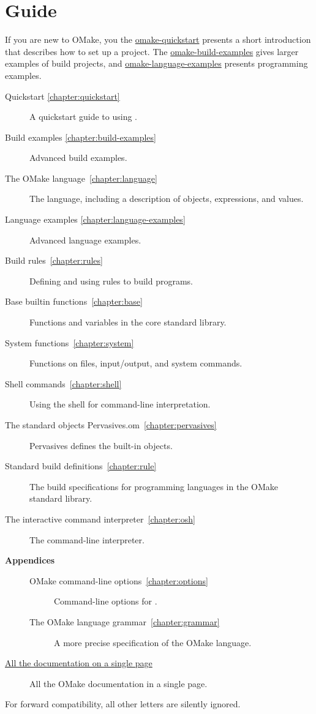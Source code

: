 %
\chapter{Guide}
\label{chapter:omake}
\label{section:guide}

If you are new to OMake, you the \href{omake-quickstart.html}{omake-quickstart} presents a short
introduction that describes how to set up a project.  The
\href{omake-build-examples.html}{omake-build-examples} gives larger examples of build projects, and
\href{omake-language-examples.html}{omake-language-examples} presents programming examples.

\begin{description}
\item[Quickstart \ref{chapter:quickstart}]
%
   A quickstart guide to using .
\item[Build examples \ref{chapter:build-examples}]
%
   Advanced build examples.
\item[The OMake language~\ref{chapter:language}]
%
   The  language, including a description of objects, expressions, and values.
\item[Language examples \ref{chapter:language-examples}]
%
   Advanced language examples.
\item[Build rules~\ref{chapter:rules}]
%
   Defining and using rules to build programs.
\item[Base builtin functions~\ref{chapter:base}]
%
   Functions and variables in the core standard library.
\item[System functions~\ref{chapter:system}]
%
   Functions on files, input/output, and system commands.
\item[Shell commands~\ref{chapter:shell}]
%
   Using the  shell for command-line interpretation.
\item[The standard objects Pervasives.om~\ref{chapter:pervasives}]
%
   Pervasives defines the built-in objects.
\item[Standard build definitions~\ref{chapter:rule}]
%
   The build specifications for programming languages in the OMake standard library.
\item[The interactive command interpreter~\ref{chapter:osh}]
%
   The  command-line interpreter.
\item[\textbf{Appendices}]
\begin{description}
\item[OMake command-line options~\ref{chapter:options}]
%
   Command-line options for .
%
\item[The OMake language grammar~\ref{chapter:grammar}]
%
   A more precise specification of the OMake language.
\end{description}
\item[\href{omake-doc.html}{All the documentation on a single page}]
%
   All the OMake documentation in a single page.
\end{description}

For forward compatibility, all other letters are silently ignored.

